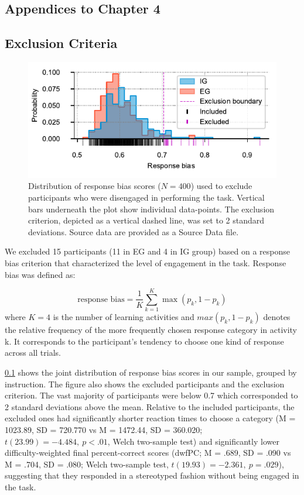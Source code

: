 \begin{subappendices}

\chapter*{Appendices to Chapter 4}\label{CH4A}

\section{Exclusion Criteria}\label{CH4A_S_exclusion_criteria}

\begin{figure}[tbh]
    \centering
    \includegraphics[width=.75\columnwidth]{Figures/c4/fig_s1.pdf}
    \caption[short Appendix figure description]{Distribution of response bias scores ($N=400$) used to exclude participants who were disengaged in performing the task. Vertical bars underneath the plot show individual data-points. The exclusion criterion, depicted as a vertical dashed line, was set to 2 standard deviations. Source data are provided as a Source Data file.}
    \label{fig:CH4A_1_exclusion_criteria}
\end{figure}

We excluded 15 participants (11 in \ac{EG} and 4 in \ac{IG} group) based on a response bias criterion that characterized the level of engagement in the task. Response bias was defined as:

\begin{equation}
    \textrm{response bias} = \frac{1}{K} \sum_{k=1}^{K}\max(p_k, 1-p_k)
\end{equation}
where $K = 4$ is the number of learning activities and $max(p_k, 1-p_k)$ denotes the relative frequency of the more frequently chosen response category in activity k. It corresponds to the participant’s tendency to choose one kind of response across all trials.

\cref{fig:CH4A_1_exclusion_criteria} shows the joint distribution of response bias scores in our sample, grouped by instruction. The figure also shows the excluded participants and the exclusion criterion. The vast majority of participants were below 0.7 which corresponded to 2 standard deviations above the mean. Relative to the included participants, the excluded ones had significantly shorter reaction times to choose a category (M = 1023.89, SD = 720.770 vs M = 1472.44, SD = 360.020; $t(23.99) = -4.484,\ p < .01$, Welch two-sample test) and significantly lower difficulty-weighted final percent-correct scores (\ac{dwfPC}; M = .689, SD = .090 vs M = .704, SD = .080; Welch two-sample test, $t(19.93) = -2.361,\ p = .029$), suggesting that they responded in a stereotyped fashion without being engaged in the task.


\end{subappendices}
